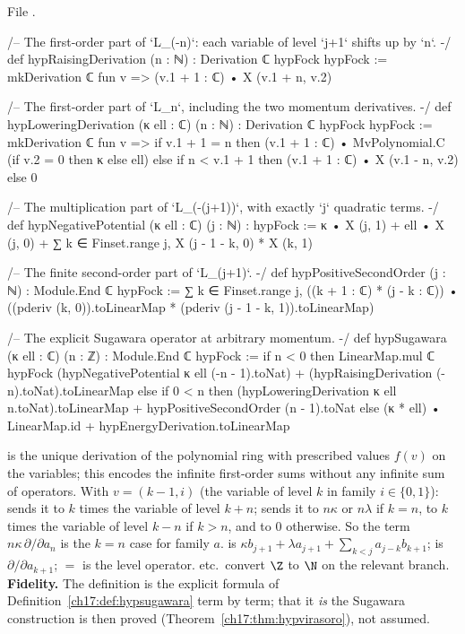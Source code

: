 \noindent File .
\begin{leancode}
/-- The first-order part of `L_(-n)`: each variable of level `j+1` shifts up by `n`. -/
def hypRaisingDerivation (n : ℕ) : Derivation ℂ hypFock hypFock :=
  mkDerivation ℂ fun v => (v.1 + 1 : ℂ) • X (v.1 + n, v.2)

/-- The first-order part of `L_n`, including the two momentum derivatives. -/
def hypLoweringDerivation (κ ell : ℂ) (n : ℕ) : Derivation ℂ hypFock hypFock :=
  mkDerivation ℂ fun v =>
    if v.1 + 1 = n then (v.1 + 1 : ℂ) • MvPolynomial.C (if v.2 = 0 then κ else ell)
    else if n < v.1 + 1 then (v.1 + 1 : ℂ) • X (v.1 - n, v.2)
    else 0

/-- The multiplication part of `L_(-(j+1))`, with exactly `j` quadratic terms. -/
def hypNegativePotential (κ ell : ℂ) (j : ℕ) : hypFock :=
  κ • X (j, 1) + ell • X (j, 0) +
    ∑ k ∈ Finset.range j, X (j - 1 - k, 0) * X (k, 1)

/-- The finite second-order part of `L_(j+1)`. -/
def hypPositiveSecondOrder (j : ℕ) : Module.End ℂ hypFock :=
  ∑ k ∈ Finset.range j, ((k + 1 : ℂ) * (j - k : ℂ)) •
    ((pderiv (k, 0)).toLinearMap * (pderiv (j - 1 - k, 1)).toLinearMap)

/-- The explicit Sugawara operator at arbitrary momentum. -/
def hypSugawara (κ ell : ℂ) (n : ℤ) : Module.End ℂ hypFock :=
  if n < 0 then
    LinearMap.mul ℂ hypFock (hypNegativePotential κ ell (-n - 1).toNat) +
      (hypRaisingDerivation (-n).toNat).toLinearMap
  else if 0 < n then
    (hypLoweringDerivation κ ell n.toNat).toLinearMap +
      hypPositiveSecondOrder (n - 1).toNat
  else (κ * ell) • LinearMap.id + hypEnergyDerivation.toLinearMap
\end{leancode}

\begin{dictionary}
 is the unique derivation of the polynomial ring with prescribed values $f(v)$ on
the variables; this encodes the infinite first-order sums without any infinite sum of operators.  With
$v=(k-1,i)$ (the variable of level $k$ in family $i\in\{0,1\}$):  sends it to $k$ times the
variable of level $k+n$;  sends it to $n\kappa$ or $n\lambda$ if $k=n$, to $k$ times
the variable of level $k-n$ if $k>n$, and to $0$ otherwise.  So the term $n\kappa\,\partial/\partial a_n$ is the
$k=n$ case for family $a$.   is $\kappa b_{j+1}+\lambda a_{j+1}+\sum_{k<j}a_{j-k}b_{k+1}$;
 is $\partial/\partial a_{k+1}$;  $=$  is the
level operator.   etc.\ convert $\Z$ to $\N$ on the relevant branch.  \textbf{Fidelity.} The
definition is the explicit formula of Definition~\ref{ch17:def:hypsugawara} term by term; that it \emph{is} the
Sugawara construction is then proved (Theorem~\ref{ch17:thm:hypvirasoro}), not assumed.
\end{dictionary}

